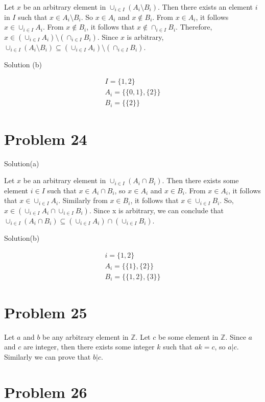 \documentclass{article}
\begin{document}
Let $x$ be an arbitrary element in $\cup_{i \in I}(A_i \setminus
B_i)$. Then there exists an element $i$ in $I$ such that $x \in A_i
\setminus B_i$. So $x \in A_i$ and $x \notin B_i$. From $x \in A_i$,
it follows $x \in \cup_{i \in I}A_i$. From $x \notin B_i$, it follows
that $x \notin \cap_{i \in I}B_i$. Therefore, $x \in (\cup_{i \in
  I}A_i) \setminus (\cap_{i \in I}B_i)$. Since $x$ is arbitrary,
$\cup_{i \in I}(A_i \setminus B_i) \subseteq (\cup_{i \in I}A_i)
\setminus (\cap_{i \in I}B_i)$.

Solution (b)

\begin{align*}
  I = \{1,2\} \\
  A_i = \{\{0,1\},\{2\}\} \\
  B_i = \{\{2\}\}
\end{align*}

\section{Problem 24}

Solution(a)

Let $x$ be an arbitrary element in $\cup_{i \in I}(A_i \cap B_i)$. Then
there exists some element $i \in I$ such that $x \in A_i \cap B_i$, so
$x \in A_i$ and $x \in B_i$. From $x \in A_i$, it follows that $x \in
\cup_{i \in I}A_i$. Similarly from $x \in B_i$, it follows that $x \in
\cup_{i \in I}B_i$. So, $x \in (\cup_{i \in I}A_i \cap \cup_{i \in
  I}B_i)$. Since x is arbitrary, we can conclude that $\cup_{i \in I}
(A_i \cap B_i) \subseteq (\cup_{i \in I} A_i) \cap (\cup_{i \in
  I}B_i)$.

Solution(b)

\begin{align*}
  i = \{1,2\} \\
  A_i = \{\{1\},\{2\}\} \\
  B_i = \{\{1,2\}, \{3\}\}
\end{align*}

\section{Problem 25}

Let $a$ and $b$ be any arbitrary element in $\mathbb{Z}$. Let $c$ be
some element in $\mathbb{Z}$. Since $a$ and $c$ are integer, then
there exists some integer $k$ such that $ak = c$, so $a | c$.
Similarly we can prove that $ b | c$.

\section{Problem 26}
\end{document}
